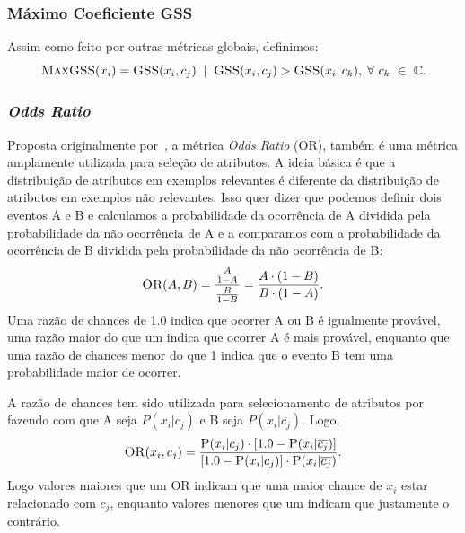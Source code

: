 \subsubsection{Máximo Coeficiente GSS}
\label{subsubsection::maxgss}

Assim como feito por outras métricas globais, definimos:
\begin{equation}\label{eqn::maxgss}
\textsc{MaxGSS}(x_i) = \textsc{GSS}(x_i,c_j) \; \; | \;\; \textsc{GSS}(x_i, c_j) > \textsc{GSS}(x_i, c_k), \; \forall\ c_k\ \in\ \mathbb{C}.
\end{equation}

\subsubsection{\textit{Odds Ratio}}
\label{subsubsection::or}

Proposta originalmente por~\cite{Rijsbergen79}, a métrica \textit{Odds Ratio} (\textsc{OR}), também é uma métrica amplamente utilizada para seleção de atributos. A ideia básica é que a distribuição de atributos em exemplos relevantes é diferente da distribuição de atributos em exemplos não relevantes. Isso quer dizer que podemos definir dois eventos A e B e calculamos a probabilidade da ocorrência de A dividida pela probabilidade da não ocorrência de A e a comparamos com a probabilidade da ocorrência de B dividida pela probabilidade da não ocorrência de B:
\begin{equation}\label{eqn::or}
   \textsc{OR}(A, B) = \frac{\frac{A}{1-A}} {\frac{B}{1-B}} = \frac{ A \cdot ( 1 - B )} { B \cdot ( 1 - A ) } .
\end{equation}
Uma razão de chances de 1.0 indica que ocorrer A ou B é igualmente provável, uma razão maior do que um indica que ocorrer A é mais provável, enquanto que uma razão de chances menor do que 1 indica que o evento B tem uma probabilidade maior de ocorrer.

A razão de chances tem sido utilizada para selecionamento de atributos por \cite{Mladenic98} fazendo com que A seja $P(x_i|c_j)$ e B seja $P(x_i|\overline{c_j})$. Logo,
\begin{equation}\label{eqn::or}
   \textsc{OR}(x_i, c_j) = \frac{ \textsc{P}(x_i|c_j) \cdot [ 1.0 - \textsc{P}(x_i|\overline{c_j}) ] }{ [ 1.0 - \textsc{P}(x_i|c_j) ] \cdot \textsc{P}(x_i|\overline{c_j})}.
\end{equation}
Logo valores maiores que um \textsc{OR} indicam que uma maior chance de $x_i$ estar relacionado com $c_j$, enquanto valores menores que um indicam que justamente o contrário.

